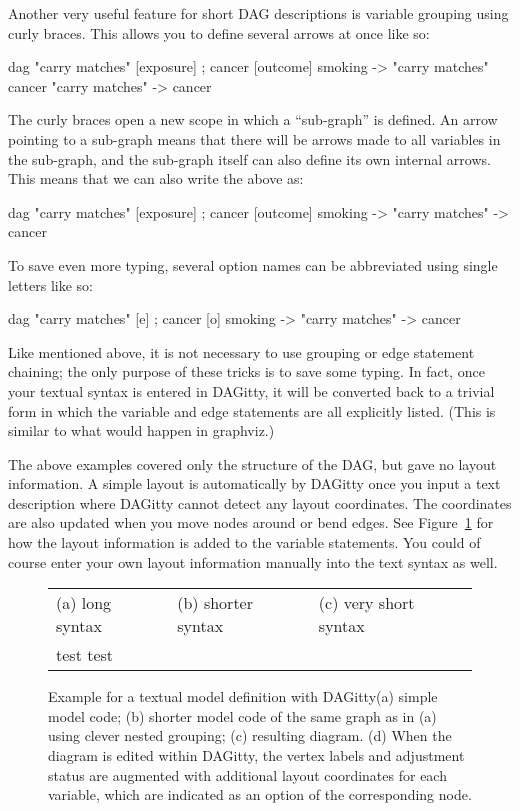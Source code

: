 \documentclass[a4paper]{article} %
\newcommand{\pp}{{\sc DAG}itty\xspace}
\newenvironment{dagcode}{%
\begingroup
\small
\verbatim
}{
\endverbatim
\endgroup
}
\begin{document}
Another very useful feature for short DAG descriptions is variable grouping using curly braces. This allows you to define several arrows at once like so:
\begin{dagcode}
dag{
  "carry matches" [exposure] ; cancer [outcome]
  smoking -> {"carry matches" cancer}
   "carry matches" -> cancer
}
\end{dagcode}

The curly braces open a new scope in which a ``sub-graph'' is defined. An arrow pointing to a sub-graph means that there will be arrows made to all variables in the sub-graph, and the sub-graph itself can also define its own internal arrows. This means that we can also write the above as:
\begin{dagcode}
dag{
  "carry matches" [exposure] ; cancer [outcome]
  smoking -> {"carry matches" -> cancer}
}
\end{dagcode}

To save even more typing, several option names can be abbreviated using single letters like so:
\begin{dagcode}
dag{
  "carry matches" [e] ; cancer [o]
  smoking -> {"carry matches" -> cancer}
}
\end{dagcode}

Like mentioned above, it is not necessary to use grouping or edge statement chaining; the only purpose of these tricks is to save some typing. In fact, once your textual syntax is entered in \pp, it will be converted back to a trivial form in which the variable and edge statements are all explicitly listed. (This is similar to what would happen in graphviz.)

The above examples covered only the structure of the DAG, but gave no layout information. A simple layout is automatically by \pp once you input a text description where \pp cannot detect any layout coordinates. The coordinates are also updated when you move nodes around or bend edges. See Figure~\ref{fig:syntax} for how the layout information is added to the variable statements. You could of course enter your own layout information manually into the text syntax as well.
\begin{figure}
\begin{tabular}{lll}
(a) long syntax & (b) shorter syntax & (c) very short syntax \\
\begin{dagcode}
test test
\end{dagcode}
\end{tabular}
\caption{
Example for a textual model definition with \pp (a) simple model code; (b) shorter model code of the same graph as in (a) using clever nested grouping; (c) resulting diagram. (d) When the diagram is edited within \pp, the vertex labels and adjustment status are augmented with additional layout coordinates for each variable, which are indicated as an option of the corresponding node.
}
\label{fig:syntax}
\end{figure}
\end{document}
